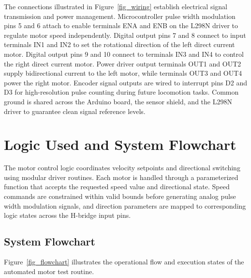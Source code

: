 \documentclass[11pt,a4paper]{article}
\begin{document}
The connections illustrated in Figure~\ref{fig_wiring} establish electrical signal transmission and power management. Microcontroller pulse width modulation pins 5 and 6 attach to enable terminals ENA and ENB on the L298N driver to regulate motor speed independently. Digital output pins 7 and 8 connect to input terminals IN1 and IN2 to set the rotational direction of the left direct current motor. Digital output pins 9 and 10 connect to terminals IN3 and IN4 to control the right direct current motor. Power driver output terminals OUT1 and OUT2 supply bidirectional current to the left motor, while terminals OUT3 and OUT4 power the right motor. Encoder signal outputs are wired to interrupt pins D2 and D3 for high-resolution pulse counting during future locomotion tasks. Common ground is shared across the Arduino board, the sensor shield, and the L298N driver to guarantee clean signal reference levels.

\section{Logic Used and System Flowchart}
The motor control logic coordinates velocity setpoints and directional switching using modular driver routines. Each motor is handled through a parameterized function that accepts the requested speed value and directional state. Speed commands are constrained within valid bounds before generating analog pulse width modulation signals, and direction parameters are mapped to corresponding logic states across the H-bridge input pins.

\subsection{System Flowchart}
Figure~\ref{fig_flowchart} illustrates the operational flow and execution states of the automated motor test routine.
\end{document}
